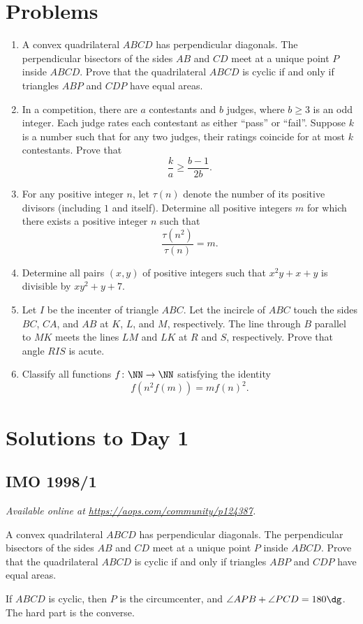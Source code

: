 \documentclass[11pt]{scrartcl}
\begin{document}
\section{Problems}
\begin{enumerate}[\bfseries 1.]
\item %
A convex quadrilateral $ABCD$ has perpendicular diagonals.
The perpendicular bisectors of the sides $AB$ and $CD$ meet
at a unique point $P$ inside $ABCD$.
Prove that the quadrilateral $ABCD$ is cyclic
if and only if triangles $ABP$ and $CDP$ have equal areas.

\item %
In a competition, there are $a$ contestants
and $b$ judges, where $b \ge 3$ is an odd integer.
Each judge rates each contestant as either ``pass'' or ``fail''.
Suppose $k$ is a number such that for any two judges,
their ratings coincide for at most $k$ contestants.
Prove that
\[ \frac ka \ge \frac{b-1}{2b}. \]

\item %
For any positive integer $n$,
let $\tau(n)$ denote the number of its positive divisors (including $1$ and itself).
Determine all positive integers $m$ for which
there exists a positive integer $n$ such that
\[ \frac{\tau(n^{2})}{\tau(n)}=m. \]

\item %
Determine all pairs $(x,y)$ of positive integers
such that $x^{2}y+x+y$ is divisible by $xy^{2}+y+7$.

\item %
Let $I$ be the incenter of triangle $ABC$.
Let the incircle of $ABC$ touch
the sides $BC$, $CA$, and $AB$ at $K$, $L$, and $M$, respectively.
The line through $B$ parallel to $MK$ meets the lines
$LM$ and $LK$ at $R$ and $S$, respectively.
Prove that angle $RIS$ is acute.

\item %
Classify all functions $f \colon \NN \to \NN$
satisfying the identity
\[ f(n^2 f(m)) = m f(n)^2. \]

\end{enumerate}
\pagebreak

\section{Solutions to Day 1}
\subsection{IMO 1998/1}
\textsl{Available online at \url{https://aops.com/community/p124387}.}
\begin{mdframed}[style=mdpurplebox,frametitle={Problem statement}]
A convex quadrilateral $ABCD$ has perpendicular diagonals.
The perpendicular bisectors of the sides $AB$ and $CD$ meet
at a unique point $P$ inside $ABCD$.
Prove that the quadrilateral $ABCD$ is cyclic
if and only if triangles $ABP$ and $CDP$ have equal areas.
\end{mdframed}
If $ABCD$ is cyclic, then $P$ is the circumcenter,
and $\angle APB + \angle PCD = 180\dg$.
The hard part is the converse.
\end{document}

